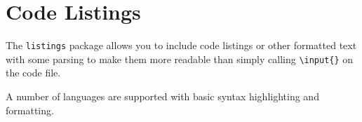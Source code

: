 \section{Code Listings}\label{sec:code}

The \texttt{listings} package allows you to include code listings or other formatted text with some parsing to make them more readable than simply calling \texttt{\textbackslash{}input\{\}} on the code file.

\lstset{language=python}
\lstset{basicstyle=\scriptsize}
\lstset{linewidth=\textwidth}
\lstset{commentstyle=\textit}
\lstset{frame=trbl,frameround=tttt}


A number of languages are supported with basic syntax highlighting and formatting.


